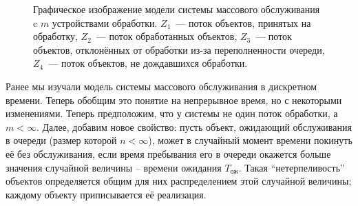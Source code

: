 \begin{figure}[H]
	\begin{center}
	\end{center}
	\caption{Графическое изображение модели системы массового обслуживания c 
	\(m\) устройствами обработки. \(Z_{1}\)~--- поток объектов, принятых на 
	обработку, \(Z_{2}\)~--- поток обработанных объектов, \(Z_{3}\)~--- поток 
	объектов, отклонённых от обработки из-за переполненности очереди, 
	\(Z_{4}\)~--- поток объектов, не дождавшихся обработки.}
\end{figure}

Ранее мы изучали модель системы массового обслуживания в дискретном времени. 
Теперь обобщим это понятие на непрерывное время, но с некоторыми изменениями. 
Теперь предположим, что у системы не один поток обработки, а \(m < \infty\). 
Далее, добавим новое свойство: пусть объект, ожидающий обслуживания в очереди 
(размер которой \(n < \infty\)), может в случайный момент времени покинуть её 
без обслуживания, если время пребывания его в очереди окажется больше значения 
случайной величины – времени ожидания \(T_{\text{ож}}\). Такая 
``нетерпеливость'' объектов определяется общим для них распределением этой 
случайной величины; каждому объекту приписывается её реализация.

